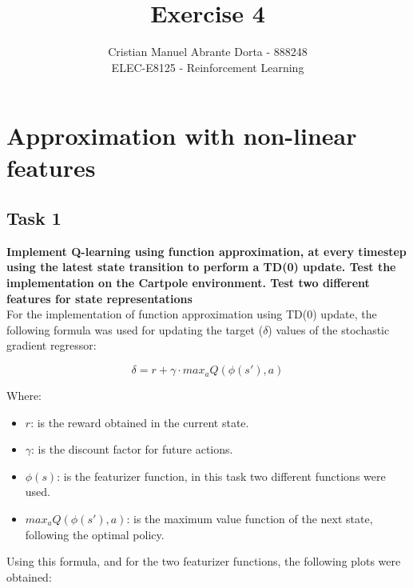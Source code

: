 \documentclass[12pt]{article}
\begin{document}
 
\title{Exercise 4}
\author{Cristian Manuel Abrante Dorta - 888248\\
ELEC-E8125 - Reinforcement Learning}

\maketitle
\section{Approximation with non-linear features}

\subsection{Task 1}
\textbf{Implement Q-learning using function approximation, at every timestep using the latest state transition to perform a TD(0) update. Test the implementation on the
Cartpole environment. Test two different features for state representations}\\

For the implementation of function approximation using TD(0) update, the following formula was used for updating the target ($\delta$) values of the stochastic gradient regressor:

\begin{equation}
    \delta = r + \gamma \cdot max_a {Q(\phi(s'), a)}
\end{equation}

Where:

\begin{itemize}
    \item $r$: is the reward obtained in the current state.
    \item $\gamma$: is the discount factor for future actions.
    \item $\phi(s)$: is the featurizer function, in this task two different functions were used.
    \item $max_aQ(\phi(s'), a)$: is the maximum value function of the next state, following the optimal policy.
\end{itemize}

Using this formula, and for the two featurizer functions, the following plots were obtained:
\end{document}
